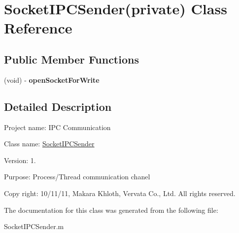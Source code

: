 \hypertarget{interface_socket_i_p_c_sender_07private_08}{
\section{\-Socket\-I\-P\-C\-Sender(private) \-Class \-Reference}
\label{interface_socket_i_p_c_sender_07private_08}
}
\subsection*{\-Public \-Member \-Functions}
\begin{DoxyCompactItemize}
\item 
\hypertarget{interface_socket_i_p_c_sender_07private_08_a6bdd06a04b82d82f775efd269ae5c8dc}{
(void) -\/ {\bfseries open\-Socket\-For\-Write}}
\label{interface_socket_i_p_c_sender_07private_08_a6bdd06a04b82d82f775efd269ae5c8dc}

\end{DoxyCompactItemize}


\subsection{\-Detailed \-Description}

\begin{DoxyItemize}
\item \-Project name\-: \-I\-P\-C \-Communication
\item \-Class name\-: \hyperlink{interface_socket_i_p_c_sender}{\-Socket\-I\-P\-C\-Sender}
\item \-Version\-: 1.
\item \-Purpose\-: \-Process/\-Thread communication chanel
\item \-Copy right\-: 10/11/11, \-Makara \-Khloth, \-Vervata \-Co., \-Ltd. \-All rights reserved. 
\end{DoxyItemize}

\-The documentation for this class was generated from the following file\-:\begin{DoxyCompactItemize}
\item 
\-Socket\-I\-P\-C\-Sender.\-m\end{DoxyCompactItemize}
